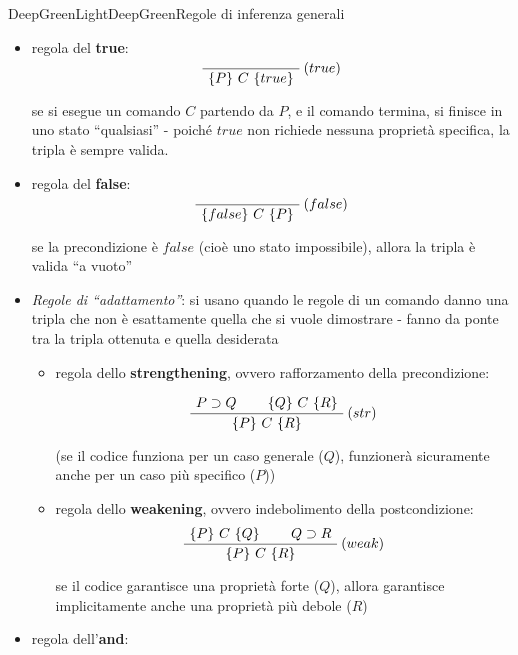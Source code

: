 \documentclass[a4paper,11pt]{report}
\begin{document}
\begin{cdefframe}{DeepGreenLight}{DeepGreen}{Regole di inferenza generali}
\begin{itemize}
    \item regola del \textbf{true}:
\[
\AxiomC{}
\RightLabel{$(true)$}
\UnaryInfC{$\{P\} \ C \ \{true\}$}
\DisplayProof
\]

se si esegue un comando \( C \) partendo da \( P \), e il comando termina, si finisce in uno stato ``qualsiasi'' - poiché \( true \) non richiede nessuna proprietà specifica, la tripla è sempre valida.

\item regola del \textbf{false}:
\[
\AxiomC{}
\RightLabel{$(false)$}
\UnaryInfC{$\{false\} \ C \ \{P\}$}
\DisplayProof
\]

se la precondizione è \( false \) (cioè uno stato impossibile), allora la tripla è valida ``a vuoto'' 

\vspace{1em}

\item \textit{Regole di ``adattamento''}: si usano quando le regole di un comando danno una tripla che non è esattamente quella che si vuole dimostrare - fanno da ponte tra la tripla ottenuta e quella desiderata

    \begin{itemize}

    \item regola dello \textbf{strengthening}, ovvero rafforzamento della precondizione:

\[
\AxiomC{$P \supset Q$}
\AxiomC{$\{Q\} \ C \ \{R\}$}
\RightLabel{$(str)$}
\BinaryInfC{$\{P\} \ C \ \{R\}$}
\DisplayProof
\]

{\color{gray}(se il codice funziona per un caso generale (\(Q\)), funzionerà sicuramente anche per un caso più specifico (\(P\)))}

    \item regola dello \textbf{weakening}, ovvero indebolimento della postcondizione:
\[
\AxiomC{$\{P\} \ C \ \{Q\}$}
\AxiomC{$Q \supset R$}
\RightLabel{$(weak)$}
\BinaryInfC{$\{P\} \ C \ \{R\}$}
\DisplayProof
\]

{\color{gray}se il codice garantisce una proprietà forte (\(Q\)), allora garantisce implicitamente anche una proprietà più debole (\(R\))}

    \end{itemize}

\vspace{1em}
    \item regola dell'\textbf{and}:


\end{itemize}
\end{cdefframe}
\end{document}
